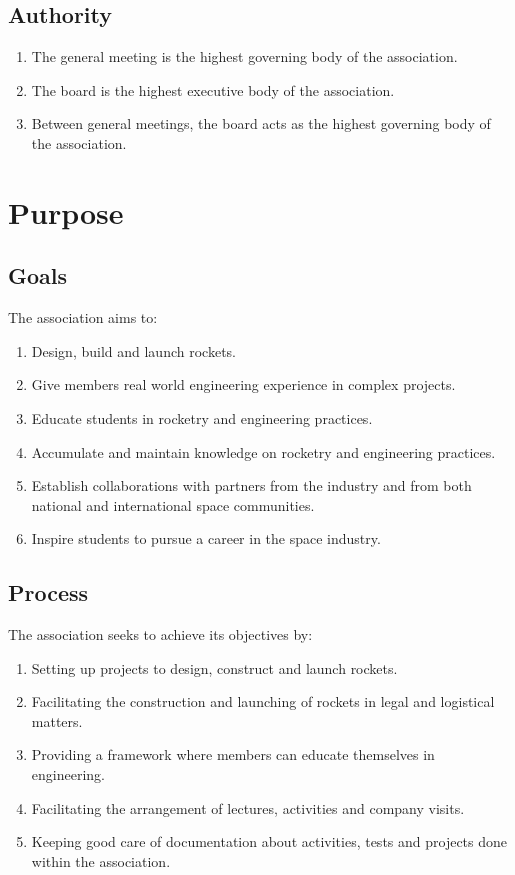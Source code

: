 \subsection{Authority}
\begin{enumerate}
  \item The general meeting is the highest governing body of the association.
  \item The board is the highest executive body of the association.
  \item Between general meetings, the board acts as the highest governing body of the association. 
\end{enumerate}

\section*{Purpose}

\subsection{Goals}
The association aims to:
\begin{enumerate}
  \item Design, build and launch rockets.
  \item Give members real world engineering experience in complex projects.
  \item Educate students in rocketry and engineering practices.
  \item Accumulate and maintain knowledge on rocketry and engineering practices.
  \item Establish collaborations with partners from the industry and from both national and international space communities.
  \item Inspire students to pursue a career in the space industry.
\end{enumerate}

\subsection{Process}
The association seeks to achieve its objectives by: 
\begin{enumerate}
  \item Setting up projects to design, construct and launch rockets.
  \item Facilitating the construction and launching of rockets in legal and logistical matters.
  \item Providing a framework where members can educate themselves in engineering.
  \item Facilitating the arrangement of lectures, activities and company visits.
  \item Keeping good care of documentation about activities, tests and projects done within the association.
\end{enumerate}


